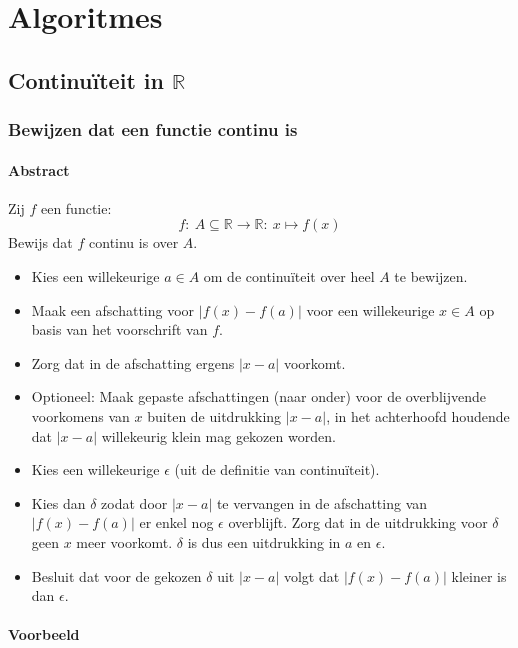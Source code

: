 \documentclass[main.tex]{subfiles}
\begin{document}
\chapter{Algoritmes}
\label{cha:algoritmes}

\section{Continu\"iteit in $\mathbb{R}$}
\label{sec:continuiteit-mathbbr}

\subsection{Bewijzen dat een functie continu is}
\label{sec:bewijzen-dat-een}

\subsubsection{Abstract}

Zij $f$ een functie:
\[ f:\ A \subseteq \mathbb{R} \rightarrow \mathbb{R}:\ x \mapsto f(x) \]
Bewijs dat $f$ continu is over $A$.

\begin{itemize}
\item Kies een willekeurige $a \in A$ om de continu\"iteit over heel $A$ te bewijzen.\needed
\item Maak een afschatting voor $|f(x)-f(a)|$ voor een willekeurige $x \in A$ op basis van het voorschrift van $f$.
\item Zorg dat in de afschatting ergens $|x-a|$ voorkomt.
\item Optioneel: Maak gepaste afschattingen (naar onder) voor de overblijvende voorkomens van $x$ buiten de uitdrukking $|x-a|$, in het achterhoofd houdende dat $|x-a|$ willekeurig klein mag gekozen worden.
\item Kies een willekeurige $\epsilon$ (uit de definitie van continu\"iteit).
\item Kies dan $\delta$ zodat door $|x-a|$ te vervangen in de afschatting van $|f(x)-f(a)|$ er enkel nog $\epsilon$ overblijft. Zorg dat in de uitdrukking voor $\delta$ geen $x$ meer voorkomt.
$\delta$ is dus een uitdrukking in $a$ en $\epsilon$.
\item Besluit dat voor de gekozen $\delta$ uit $|x-a|$ volgt dat $|f(x)-f(a)|$ kleiner is dan $\epsilon$.
\end{itemize}
\feed
\subsubsection{Voorbeeld}
\end{document}
